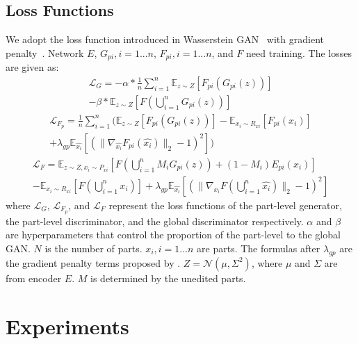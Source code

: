 \documentclass[letterpaper]{article} %
\begin{document}
\subsection{Loss Functions}

We adopt the loss function introduced in Wasserstein GAN~\citep{pmlr-v70-arjovsky17a} with gradient penalty~\citep{NIPS2017_892c3b1c}. Network $E$, $G_{pi}, i=1...n$, $F_{pi}, i=1...n$, and $F$ need training. The losses are given as:
\begin{equation}
\begin{gathered}
    \mathcal{L}_G = -\alpha*\frac{1}{n}\sum_{i=1}^n \mathbb{E}_{z \sim Z}[F_{pi}(G_{pi}(z))] \\
    - \beta*\mathbb{E}_{z \sim Z}[F(\bigcup_{i=1}^n G_{pi}(z))]
\end{gathered}
\end{equation}
\begin{equation}
\begin{gathered}
    \mathcal{L}_{F_p} = \frac{1}{n}\sum_{i=1}^n (\mathbb{E}_{z \sim Z}[F_{pi}(G_{pi}(z))]
    - \mathbb{E}_{x_i \sim R_{xi}}[F_{pi}(x_i)] \\
    + \lambda_{gp} \mathbb{E}_{\hat{x_i}}[(\lVert \nabla_{\hat{x_i}} F_{pi}(\hat{x_i}) \rVert_2 - 1)^2])
\end{gathered}
\end{equation}
\begin{equation}
\begin{gathered}
    \mathcal{L}_F = \mathbb{E}_{z \sim Z, x_i \sim P_{xi}}[F(\bigcup_{i=1}^n M_i G_{pi}(z))
    + (1-M_i) E_{pi}(x_i)] \\
    - \mathbb{E}_{x_i \sim R_{xi}}[F(\bigcup_{i=1}^n x_i)]
    + \lambda_{gp} \mathbb{E}_{\hat{x_i}}[(\lVert \nabla_{\hat{x_i}} F(\bigcup_{i=1}^n \hat{x_i}) \rVert_2 - 1)^2]
\end{gathered}
\end{equation}
where $\mathcal{L}_G$, $\mathcal{L}_{F_p}$, and $\mathcal{L}_F$ represent the loss functions of the part-level generator, the part-level discriminator, and the global discriminator respectively. $\alpha$ and $\beta$ are hyperparameters that control the proportion of the part-level to the global GAN. $N$ is the number of parts. $x_i, i=1...n$ are parts. The formulas after $\lambda_{gp}$ are the gradient penalty terms proposed by \citet{NIPS2017_892c3b1c}. $Z=\mathcal{N}(\mu, \Sigma^2)$, where $\mu$ and $\Sigma$ are from encoder $E$. $M$ is determined by the unedited parts.


\section{Experiments}
\end{document}
